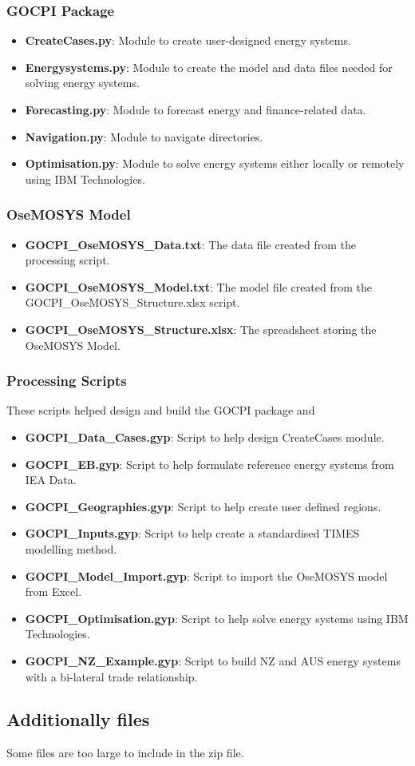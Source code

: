 \documentclass[12pt]{article}
\begin{document}
\subsubsection{GOCPI Package}
\begin{itemize}
	\item \textbf{CreateCases.py}: Module to create user-designed energy systems.
	\item \textbf{Energysystems.py}: Module to create the model and data files needed for solving energy systems.
	\item \textbf{Forecasting.py}: Module to forecast energy and finance-related data.
	\item \textbf{Navigation.py}: Module to navigate directories.
	\item \textbf{Optimisation.py}: Module to solve energy systems either locally or remotely using IBM Technologies.
\end{itemize}
\subsubsection{OseMOSYS Model}
\begin{itemize}
	\item \textbf{GOCPI\_OseMOSYS\_Data.txt}: The data file created from the processing script.
	\item \textbf{GOCPI\_OseMOSYS\_Model.txt}: The model file created from the GOCPI\_OseMOSYS\_Structure.xlsx script.
	\item \textbf{GOCPI\_OseMOSYS\_Structure.xlsx}: The spreadsheet storing the OseMOSYS Model.
\end{itemize}
\subsubsection{Processing Scripts}
These scripts helped design and build the GOCPI package and 
\begin{itemize}
	\item \textbf{GOCPI\_Data\_Cases.gyp}: Script to help design CreateCases module.
	\item \textbf{GOCPI\_EB.gyp}: Script to help formulate reference energy systems from IEA Data.
	\item \textbf{GOCPI\_Geographies.gyp}: Script to help create user defined regions.
	\item \textbf{GOCPI\_Inputs.gyp}: Script to help create a standardised TIMES modelling method.
	\item \textbf{GOCPI\_Model\_Import.gyp}: Script to import the OseMOSYS model from Excel.
	\item \textbf{GOCPI\_Optimisation.gyp}: Script to help solve energy systems using IBM Technologies.
	\item \textbf{GOCPI\_NZ\_Example.gyp}: Script to build NZ and AUS energy systems with a bi-lateral trade relationship.
\end{itemize}
\subsection{Additionally files}
Some files are too large to include in the zip file.
\end{document}
